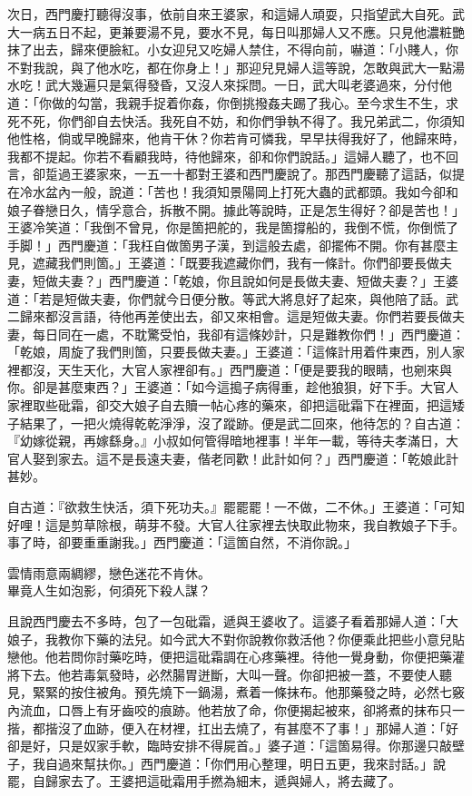 次日，西門慶打聽得沒事，依前自來王婆家，和這婦人頑耍，只指望武大自死。武大一病五日不起，更兼要湯不見，要水不見，每日叫那婦人又不應。只見他濃粧艷抹了出去，歸來便臉紅。小女迎兒又吃婦人禁住，不得向前，嚇道：「小賤人，你不對我說，與了他水吃，都在你身上！」那迎兒見婦人這等說，怎敢與武大一點湯水吃！武大幾遍只是氣得發昏，又沒人來採問。一日，武大叫老婆過來，分付他道：「你做的勾當，我親手捉着你姦，你倒挑撥姦夫踢了我心。至今求生不生，求死不死，你們卻自去快活。我死自不妨，和你們爭執不得了。我兄弟武二，你須知他性格，倘或早晚歸來，他肯干休？你若肯可憐我，早早扶得我好了，他歸來時，我都不提起。你若不看顧我時，待他歸來，卻和你們說話。」這婦人聽了，也不回言，卻踅過王婆家來，一五一十都對王婆和西門慶說了。那西門慶聽了這話，似提在冷水盆內一般，說道：「苦也！我須知景陽岡上打死大蟲的武都頭。我如今卻和娘子眷戀日久，情孚意合，拆散不開。據此等說時，正是怎生得好？卻是苦也！」王婆冷笑道：「我倒不曾見，你是箇把舵的，我是箇撐船的，我倒不慌，你倒慌了手脚！」西門慶道：「我枉自做箇男子漢，到這般去處，卻擺佈不開。你有甚麼主見，遮藏我們則箇。」王婆道：「既要我遮藏你們，我有一條計。你們卻要長做夫妻，短做夫妻？」{}西門慶道：「乾娘，你且說如何是長做夫妻、短做夫妻？」王婆道：「若是短做夫妻，你們就今日便分散。等武大將息好了起來，與他陪了話。武二歸來都沒言語，待他再差使出去，卻又來相會。這是短做夫妻。你們若要長做夫妻，每日同在一處，不耽驚受怕，我卻有這條妙計，只是難教你們！」西門慶道：「乾娘，周旋了我們則箇，只要長做夫妻。」王婆道：「這條計用着件東西，別人家裡都沒，天生天化，大官人家裡卻有。」西門慶道：「便是要我的眼睛，也剜來與你。卻是甚麼東西？」王婆道：「如今這搗子病得重，趁他狼狽，好下手。{}大官人家裡取些砒霜，卻交大娘子自去贖一帖心疼的藥來，卻把這砒霜下在裡面，把這矮子結果了，一把火燒得乾乾淨淨，沒了蹤跡。便是武二回來，他待怎的？自古道：『幼嫁從親，再嫁繇身。』小叔如何管得暗地裡事！半年一載，等待夫孝滿日，大官人娶到家去。這不是長遠夫妻，偕老同歡！此計如何？」西門慶道：「乾娘此計甚妙。

自古道：『欲救生快活，須下死功夫。』罷罷罷！一不做，二不休。」王婆道：「可知好哩！這是剪草除根，萌芽不發。{}大官人往家裡去快取此物來，我自教娘子下手。事了時，卻要重重謝我。」西門慶道：「這箇自然，不消你說。」

\begin{myquote} 
雲情雨意兩綢繆，戀色迷花不肯休。\\畢竟人生如泡影，何須死下殺人謀？
\end{myquote} 

且說西門慶去不多時，包了一包砒霜，遞與王婆收了。這婆子看着那婦人道：「大娘子，我教你下藥的法兒。如今武大不對你說教你救活他？你便乘此把些小意兒貼戀他。他若問你討藥吃時，便把這砒霜調在心疼藥裡。待他一覺身動，你便把藥灌將下去。他若毒氣發時，必然腸胃迸斷，大叫一聲。你卻把被一蓋，不要使人聽見，緊緊的按住被角。{}預先燒下一鍋湯，煮着一條抹布。他那藥發之時，必然七竅內流血，口唇上有牙齒咬的痕跡。他若放了命，你便揭起被來，卻將煮的抹布只一揩，都揩沒了血跡，便入在材裡，扛出去燒了，有甚麼不了事！」那婦人道：「好卻是好，{}只是奴家手軟，臨時安排不得屍首。」婆子道：「這箇易得。你那邊只敲壁子，我自過來幫扶你。」西門慶道：「你們用心整理，明日五更，我來討話。」說罷，自歸家去了。王婆把這砒霜用手撚為細末，遞與婦人，將去藏了。

